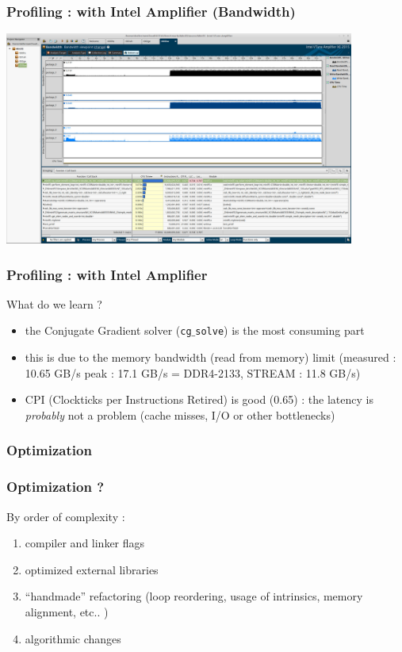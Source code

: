 \begin{frame}[containsverbatim]
	\frametitle{Profiling : with Intel Amplifier (Bandwidth)}
	\includegraphics[width=115mm]{Day1/images/Amplifier3.jpg}
\end{frame}

\begin{frame}
	\frametitle{Profiling : with Intel Amplifier}

What do we learn ?

	\begin{itemize}
	\item the Conjugate Gradient solver ({\tt cg$\_$solve}) is the most consuming part
	\item this is due to the memory bandwidth (read from memory) limit (measured : 10.65 GB/s peak : 17.1 GB/s = DDR4-2133, STREAM : 11.8 GB/s)
	\item CPI (Clockticks per Instructions Retired) is good (0.65) : the latency is {\it probably} not a problem (cache misses, I/O or other bottlenecks)
	\end{itemize}
\end{frame}

\subsubsection{Optimization}

\begin{frame}
	\frametitle{Optimization ?}

	By order of complexity :

	\begin{enumerate}
	\item compiler and linker flags
	\item optimized external libraries
	\item ``handmade'' refactoring (loop reordering, usage of intrinsics, memory alignment, etc.. )
	\item algorithmic changes
	\end{enumerate}
\end{frame}

